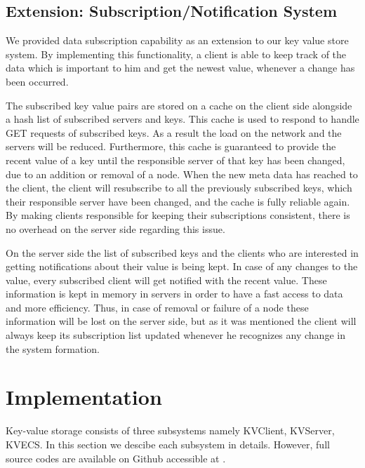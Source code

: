 \documentclass{sig-alternate}
\begin{document}
\subsection{Extension: Subscription/Notification System }

We provided data subscription capability as an extension to our key value store system. By implementing  this functionality, a client is able to keep track of the data which is important to him and get the newest value, whenever a change has been occurred. 

The subscribed key value pairs are stored on a cache on the client side alongside a hash list of subscribed servers and keys. This cache is used to respond to handle GET requests of subscribed keys. As a result the load on the network and the servers will be reduced. Furthermore, this cache is guaranteed to provide the recent value of a key until the responsible server of that key has been changed, due to an addition or removal of a node. When the new meta data has reached to the client, the client will resubscribe to all the previously subscribed keys, which their responsible server have been changed, and the cache is fully reliable again. By making clients responsible for keeping their subscriptions consistent, there is no overhead on the server side regarding this issue.

On the server side the list of subscribed keys and the clients who are interested in getting notifications about their value is being kept. In case of any changes to the value, every subscribed client will get notified with the recent value. These information is kept in memory in servers in order to have a fast access to data and more efficiency. Thus, in case of removal or failure of a node these information will be lost on the server side, but as it was mentioned the client will always keep its subscription list updated whenever he recognizes any change in the system formation.


\section{Implementation}\label{implementation}
Key-value storage consists of three subsystems namely KVClient, KVServer, KVECS. 
In this section we descibe each subsystem in details. However, full source codes are available on Github accessible at \cite{github}. 
\end{document}
